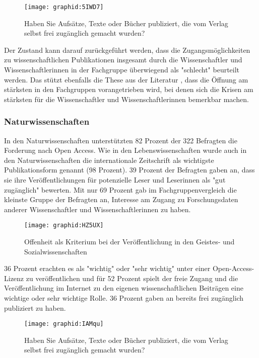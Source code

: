 \begin{figure}[h!]
\texttt{[image: graphid:5IWD7]}
\caption{Haben Sie Aufsätze, Texte oder Bücher publiziert, die vom Verlag selbst frei zugänglich gemacht wurden?}
\end{figure}

Der Zustand kann darauf zurückgeführt werden, dass die Zugangsmöglichkeiten zu wissenschaftlichen Publikationen insgesamt durch die Wissenschaftler und Wissenschaftlerinnen in der Fachgruppe überwiegend als "schlecht" beurteilt werden. Das stützt ebenfalls die These aus der Literatur \cite[:6]{naeder_2010_open}, dass die Öffnung am stärksten in den Fachgruppen vorangetrieben wird, bei denen sich die Krisen am stärksten für die Wissenschaftler und Wissenschaftlerinnen bemerkbar machen.

\subsubsection{Naturwissenschaften}

In den Naturwissenschaften unterstützten 82 Prozent der 322 Befragten die Forderung nach Open Access. Wie in den Lebenswissenschaften wurde auch in den Naturwissenschaften die internationale Zeitschrift als wichtigste Publikationsform genannt (98 Prozent). 39 Prozent der Befragten gaben an, dass sie ihre Veröffentlichungen für potenzielle Leser und Leserinnen als "gut zugänglich" bewerten. Mit nur 69 Prozent gab im Fachgruppenvergleich die kleinste Gruppe der Befragten an, Interesse am Zugang zu Forschungsdaten anderer Wissenschaftler und Wissenschaftlerinnen zu haben.

\begin{figure}[h!]
\texttt{[image: graphid:HZ5UX]}
\caption{Offenheit als Kriterium bei der Veröffentlichung in den Geistes- und Sozialwissenschaften}
\end{figure}

36 Prozent erachten es als "wichtig" oder "sehr wichtig" unter einer Open-Access-Lizenz zu veröffentlichen und für 52 Prozent spielt der freie Zugang und die Veröffentlichung im Internet zu den eigenen wissenschaftlichen Beiträgen eine wichtige oder sehr wichtige Rolle. 36 Prozent gaben an bereits frei zugänglich publiziert zu haben.

\begin{figure}[h!]
\texttt{[image: graphid:IAMqu]}
\caption{Haben Sie Aufsätze, Texte oder Bücher publiziert, die vom Verlag selbst frei zugänglich gemacht wurden?}
\end{figure}

